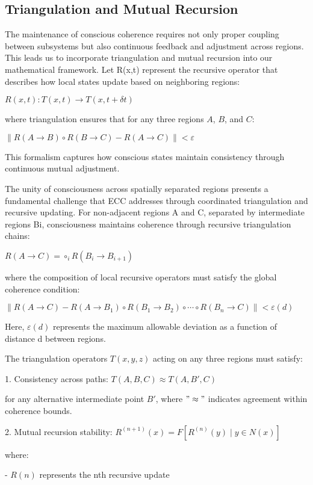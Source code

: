 \begin{refsection}
\section{Triangulation and Mutual Recursion}

The maintenance of conscious coherence requires not only proper coupling between subsystems but also continuous feedback and adjustment across regions. This leads us to incorporate triangulation and mutual recursion into our mathematical framework. Let R(x,t) represent the recursive operator that describes how local states update based on neighboring regions:

$R(x,t): T(x,t) \rightarrow T(x,t + \delta t)$

where triangulation ensures that for any three regions $A$, $B$, and $C$:

$\|R(A \rightarrow B) \circ R(B \rightarrow C) - R(A \rightarrow C)\| < \varepsilon$

This formalism captures how conscious states maintain consistency through continuous mutual adjustment.

The unity of consciousness across spatially separated regions presents a fundamental challenge that ECC addresses through coordinated triangulation and recursive updating. For non-adjacent regions A and C, separated by intermediate regions {Bi}, consciousness maintains coherence through recursive triangulation chains:

$R(A \rightarrow C) = \circ_{i} R(B_i \rightarrow B_{i+1})$

where the composition of local recursive operators must satisfy the global coherence condition:

$\|R(A \rightarrow C) - R(A \rightarrow B_1) \circ R(B_1 \rightarrow B_2) \circ \cdots \circ R(B_n \rightarrow C)\| < \varepsilon(d)$

Here, $\varepsilon(d)$ represents the maximum allowable deviation as a function of distance d between regions.

The triangulation operators $T(x,y,z)$ acting on any three regions must satisfy:

1. Consistency across paths:
$T(A,B,C) \approx T(A,B',C)$

for any alternative intermediate point $B'$, where $"\approx"$ indicates agreement within coherence bounds.

2. Mutual recursion stability:
$R^{(n+1)}(x) = F[R^{(n)}(y) \mid y \in N(x)]$

where:

- $R(n)$ represents the nth recursive update


\end{refsection}
